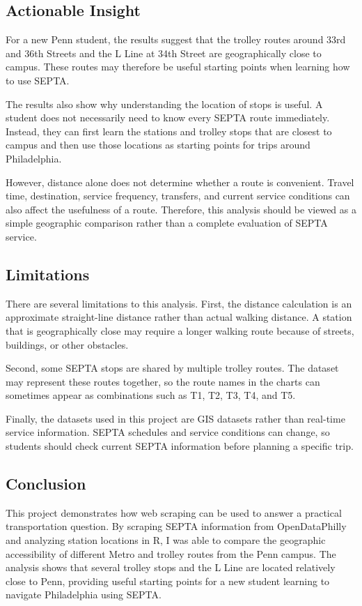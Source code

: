 \documentclass[
]{article}
\begin{document}
\subsection{Actionable Insight}\label{actionable-insight}

For a new Penn student, the results suggest that the trolley routes
around 33rd and 36th Streets and the L Line at 34th Street are
geographically close to campus. These routes may therefore be useful
starting points when learning how to use SEPTA.

The results also show why understanding the location of stops is useful.
A student does not necessarily need to know every SEPTA route
immediately. Instead, they can first learn the stations and trolley
stops that are closest to campus and then use those locations as
starting points for trips around Philadelphia.

However, distance alone does not determine whether a route is
convenient. Travel time, destination, service frequency, transfers, and
current service conditions can also affect the usefulness of a route.
Therefore, this analysis should be viewed as a simple geographic
comparison rather than a complete evaluation of SEPTA service.

\subsection{Limitations}\label{limitations}

There are several limitations to this analysis. First, the distance
calculation is an approximate straight-line distance rather than actual
walking distance. A station that is geographically close may require a
longer walking route because of streets, buildings, or other obstacles.

Second, some SEPTA stops are shared by multiple trolley routes. The
dataset may represent these routes together, so the route names in the
charts can sometimes appear as combinations such as T1, T2, T3, T4, and
T5.

Finally, the datasets used in this project are GIS datasets rather than
real-time service information. SEPTA schedules and service conditions
can change, so students should check current SEPTA information before
planning a specific trip.

\subsection{Conclusion}\label{conclusion}

This project demonstrates how web scraping can be used to answer a
practical transportation question. By scraping SEPTA information from
OpenDataPhilly and analyzing station locations in R, I was able to
compare the geographic accessibility of different Metro and trolley
routes from the Penn campus. The analysis shows that several trolley
stops and the L Line are located relatively close to Penn, providing
useful starting points for a new student learning to navigate
Philadelphia using SEPTA.
\end{document}
